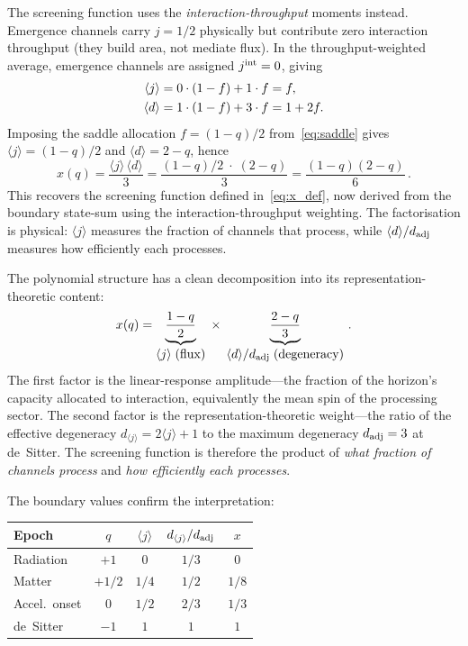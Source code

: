 \documentclass[aps,prd,twocolumn,10pt,superscriptaddress,nofootinbib]{revtex4-2}
\begin{document}
The screening function uses the \emph{interaction-throughput}
moments instead.  Emergence channels carry $j = 1/2$ physically
but contribute zero interaction throughput (they build area, not
mediate flux).  In the throughput-weighted average, emergence
channels are assigned $j^{\rm int} = 0$, giving
\begin{align}
\langle j \rangle
&=0 \cdot (1-f)+1 \cdot f=f,\notag\\
\langle d \rangle
&=1 \cdot (1-f)+3 \cdot f=1+2f.
\label{eq:moments_f}
\end{align}
Imposing the saddle allocation $f = (1{-}q)/2$
from~\eqref{eq:saddle} gives $\langle j \rangle = (1{-}q)/2$ and
$\langle d \rangle = 2 - q$, hence
\begin{equation}
x(q) = \frac{\langle j \rangle\,\langle d \rangle}{3}
  = \frac{(1-q)/2 \;\cdot\; (2-q)}{3}
  = \frac{(1-q)(2-q)}{6}\,.
\label{eq:x_q_final}
\end{equation}
This recovers the screening function defined
in~\eqref{eq:x_def}, now derived from the boundary state-sum
using the interaction-throughput weighting.  The factorisation is
physical: $\langle j \rangle$ measures the fraction of channels
that process, while $\langle d \rangle / d_{\rm adj}$ measures
how efficiently each processes.

The polynomial structure has a clean decomposition into its
representation-theoretic content:
\begin{equation}
x(q) = \underbrace{\frac{1-q}{2}}_{\displaystyle
  \langle j \rangle\;\text{(flux)}}
  \;\times\;
  \underbrace{\frac{2-q}{3}}_{\displaystyle
  \langle d \rangle/d_{\rm adj}\;\text{(degeneracy)}}\,.
\label{eq:x_decomposed}
\end{equation}
The first factor is the linear-response amplitude---the fraction
of the horizon's capacity allocated to interaction, equivalently
the mean spin of the processing sector.  The second factor is
the representation-theoretic weight---the ratio of the effective
degeneracy $d_{\langle j \rangle} = 2\langle j \rangle + 1$ to
the maximum degeneracy $d_{\rm adj} = 3$ at de~Sitter.  The
screening function is therefore the product of \emph{what fraction of
channels process} and \emph{how efficiently each processes}.

The boundary values confirm the interpretation:
\begin{center}
\begin{tabular}{lcccc}
\toprule
Epoch & $q$ & $\langle j \rangle$ &
  $d_{\langle j \rangle}/d_{\rm adj}$ & $x$ \\
\midrule
Radiation & $+1$ & $0$ & $1/3$ & $0$ \\
Matter & $+1/2$ & $1/4$ & $1/2$ & $1/8$ \\
Accel.\ onset & $0$ & $1/2$ & $2/3$ & $1/3$ \\
de~Sitter & $-1$ & $1$ & $1$ & $1$ \\
\bottomrule
\end{tabular}
\end{center}
\end{document}
